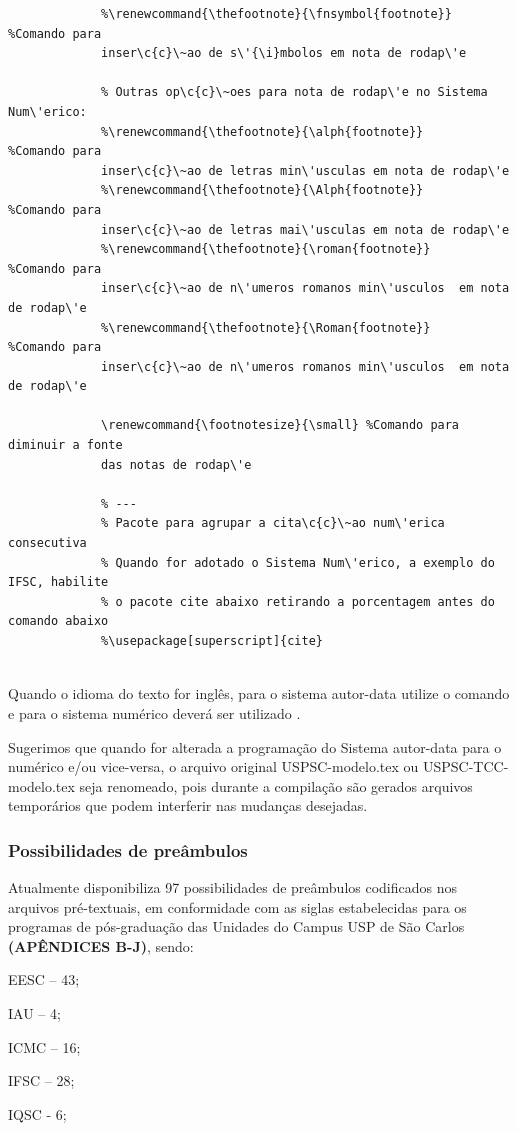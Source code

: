 \begin{verbatim}
			 %\renewcommand{\thefootnote}{\fnsymbol{footnote}} %Comando para 
			 inser\c{c}\~ao de s\'{\i}mbolos em nota de rodap\'e
			  
			 % Outras op\c{c}\~oes para nota de rodap\'e no Sistema Num\'erico:
			 %\renewcommand{\thefootnote}{\alph{footnote}}     %Comando para 
			 inser\c{c}\~ao de letras min\'usculas em nota de rodap\'e
			 %\renewcommand{\thefootnote}{\Alph{footnote}}     %Comando para 
			 inser\c{c}\~ao de letras mai\'usculas em nota de rodap\'e
			 %\renewcommand{\thefootnote}{\roman{footnote}}    %Comando para 
			 inser\c{c}\~ao de n\'umeros romanos min\'usculos  em nota de rodap\'e
			 %\renewcommand{\thefootnote}{\Roman{footnote}}    %Comando para 
			 inser\c{c}\~ao de n\'umeros romanos min\'usculos  em nota de rodap\'e
			  
			 \renewcommand{\footnotesize}{\small} %Comando para diminuir a fonte 
			 das notas de rodap\'e	
			  
			 % ---
			 % Pacote para agrupar a cita\c{c}\~ao num\'erica consecutiva
			 % Quando for adotado o Sistema Num\'erico, a exemplo do IFSC, habilite 
			 % o pacote cite abaixo retirando a porcentagem antes do comando abaixo
			 %\usepackage[superscript]{cite}
			  			  	
			 \end{verbatim}

Quando o idioma do texto for ingl\^es, para o sistema autor-data utilize o comando \verb++ e para o sistema num\'erico dever\'a ser utilizado \verb++.

Sugerimos que quando for alterada a programa\c{c}\~ao do Sistema autor-data para o num\'erico e/ou vice-versa, o arquivo original USPSC-modelo.tex ou USPSC-TCC-modelo.tex seja renomeado, pois durante a compila\c{c}\~ao s\~ao gerados arquivos tempor\'arios que podem interferir nas mudan\c{c}as desejadas.			 

\subsubsection{Possibilidades de pre\^ambulos}

Atualmente disponibiliza 97 possibilidades de pre\^ambulos codificados nos arquivos pr\'e-textuais, em conformidade com as siglas estabelecidas para os programas de p\'os-gradua\c{c}\~ao das Unidades do Campus USP de S\~ao Carlos \textbf{(AP\^ENDICES B-J)}, sendo:
	
				  
			   \begin{alineas}
			   	\item EESC – 43;
				\item IAU – 4;
				\item  ICMC – 16;
				\item  IFSC – 28;
				\item  IQSC - 6;
			  \end{alineas}	
			  
